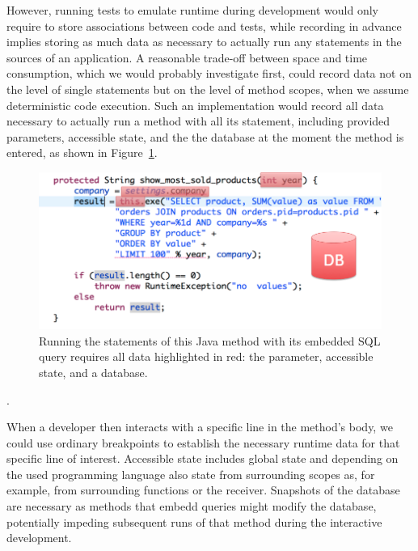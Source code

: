 However, running tests to emulate runtime during development would only require to store associations between code and tests, while recording in advance implies storing as much data as necessary to actually run any statements in the sources of an application.
A reasonable trade-off between space and time consumption, which we would probably investigate first, could record data not on the level of single statements but on the level of method scopes, when we assume deterministic code execution.
Such an implementation would record all data necessary to actually run a method with all its statement, including provided parameters, accessible state, and the the database at the moment the method is entered, as shown in Figure~\ref{fig:context_recording}.

\begin{figure}
    \includegraphics[width=\linewidth]{images/context_recording}
    \caption{Running the statements of this Java method with its embedded SQL query requires all data highlighted in red: the parameter, accessible state, and a database.}
    \label{fig:context_recording}
\end{figure}.

When a developer then interacts with a specific line in the method's body, we could use ordinary breakpoints to establish the necessary runtime data for that specific line of interest. 
Accessible state includes global state and depending on the used programming language also state from surrounding scopes as, for example, from surrounding functions or the receiver.
Snapshots of the database are necessary as methods that embedd queries might modify the database, potentially impeding subsequent runs of that method during the interactive development.
